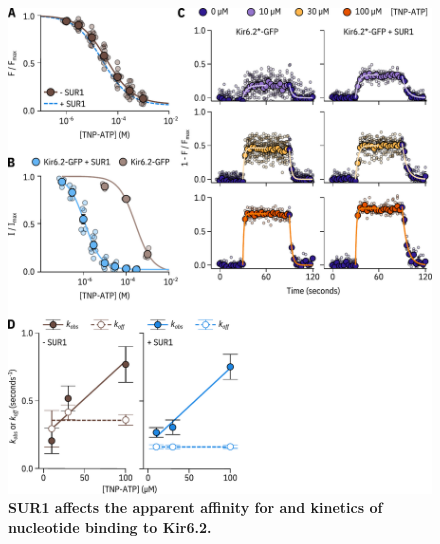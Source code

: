\documentclass[10pt,lineno, doublespacing]{elife_modified}
\begin{document}
\begin{figure}
\begin{fullwidth}
\centering
\includegraphics[height=0.75\textheight]{figure_four}
\caption{\textbf{SUR1 affects the apparent affinity for and kinetics of nucleotide binding to Kir6.2.}}
\label{fig:four}
\end{fullwidth}
\end{figure}
\end{document}
